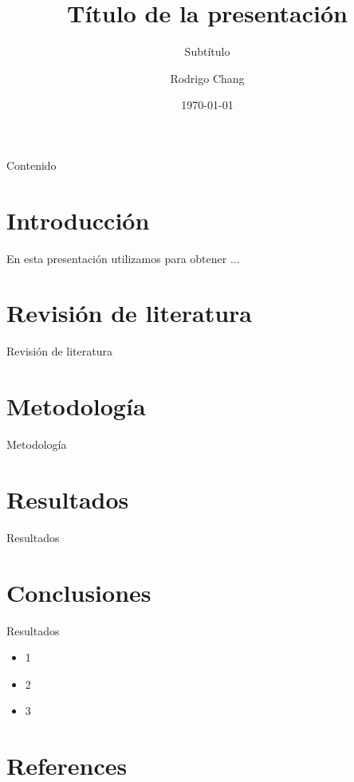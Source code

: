 \documentclass{beamer}
\title[Título corto]{Título de la presentación}
\subtitle{Subtítulo}
\institute[]{Banco de Guatemala\\Departamento de Investigaciones Económicas}
\author[Rodrigo Chang (BG)]{Rodrigo Chang}
\date{\today}
\begin{document}
\begin{frame}[plain]
\maketitle
\end{frame}


\begin{frame}{Contenido}
\tableofcontents
\end{frame}

\section{Introducción}
\begin{frame}
   En esta presentación utilizamos \textcite{degroot2012probability} para obtener ... 
\end{frame}

\section{Revisión de literatura}
\begin{frame}{Revisión de literatura}
    \lipsum[1]
\end{frame}

\section{Metodología}
\begin{frame}{Metodología}
    \lipsum[1]
\end{frame}

\section{Resultados}
\begin{frame}{Resultados}
    \lipsum[1]
\end{frame}

\section{Conclusiones}
\begin{frame}{Resultados}
    \begin{itemize}
        \item 1
        \item 2
        \item 3
    \end{itemize}
\end{frame}
    
\section{References}
\begin{frame}[allowframebreaks]
    \printbibliography  
\end{frame}
\end{document}
